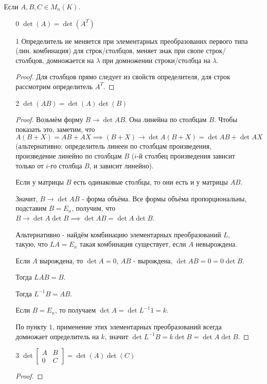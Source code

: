 \begin{properties} \thmslashn

    Если $A, B, C\in M_{n}(K)$.
\begin{enumerate}
    \item[0] $\det(A) = \det(A^{T})$ 
    \item[1] Определитель не меняется при элементарных преобразованих первого типа (лин. комбинация) для строк/столбцов, меняет знак при свопе строк/столбцов, домножается на $\lambda$ при домножении строки/столбца на $\lambda$.
        \begin{proof} \thmslashn
            
            Для столбцов прямо следует из свойств определителя, для строк рассмотрим определитель $A^{T}$.
        \end{proof}
    \item[2] $\det(AB) = \det(A)\det(B)$
        \begin{proof} \thmslashn
        
            Возьмём форму $B \to \det AB$. Она линейна по столбцам $B$. Чтобы показать это, заметим, что $A(B + X) = AB+AX \implies (B+X) \to \det A(B+X) = \det AB +\det AX$ (альтернативно: определитель линеен по столбцам произведения, произведение линейно по столбцам $B$ ($i$-й столбец произведения зависит только от $i$-го столбца $B$, и зависит линейно).

            Если у матрицы $B$ есть одинаковые столбцы, то они есть и у матрицы $AB$. 

            Значит, $B \to \det AB$ - форма объёма. Все формы объёма пропорциональны, подставим $B = E_{n}$, получим, что $B \to \det A \det B \implies \det AB = \det A \det B$.

            Альтернативно - найдём комбинацию элементарных преобразований $L$, такую, что $LA = E_{n}$ такая комбинация существует, если $A$ невырождена.

            Если $A$ вырождена, то $\det A = 0$, $AB$ - вырождена, $\det AB = 0 = 0\det B$.

            Тогда $LAB = B$.

            Тогда $L^{-1}B = AB$.

            Если $B=E_{n}$, то получаем $\det A = \det L^{-1} 1 = k$.

            По пункту $1$, применение этих элементарных преобразований всегда домножает определитель на $k$, значит $\det L^{-1}B = k\det B = \det A\det B$.
        \end{proof}
    \item[3] $\det \begin{bmatrix} A & B\\ 0 & C \end{bmatrix} = \det(A)\det(C)$
        \begin{proof} \thmslashn
        

\end{proof}
\end{enumerate}
\end{properties}
